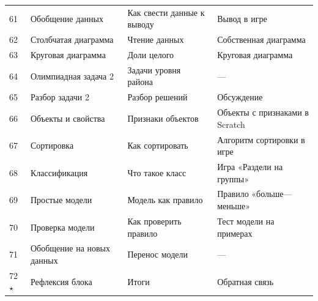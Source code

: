 \documentclass[12pt,a4paper]{article}
\begin{document}
\begin{longtable}{C{1.0cm}L{4.4cm}L{4.0cm}L{4.4cm}}
61 & Обобщение данных & Как свести данные к выводу & Вывод в игре\\
62 & Столбчатая диаграмма & Чтение данных & Собственная диаграмма\\
63 & Круговая диаграмма & Доли целого & Круговая диаграмма\\
64 & Олимпиадная задача 2 & Задачи уровня района & ---\\
65 & Разбор задачи 2 & Разбор решений & Обсуждение\\
66 & Объекты и свойства & Признаки объектов & Объекты с признаками в Scratch\\
67 & Сортировка & Как сортировать & Алгоритм сортировки в игре\\
68 & Классификация & Что такое класс & Игра «Раздели на группы»\\
69 & Простые модели & Модель как правило & Правило «больше---меньше»\\
70 & Проверка модели & Как проверить правило & Тест модели на примерах\\
71 & Обобщение на новых данных & Перенос модели & ---\\
72 $\star$ & Рефлексия блока & Итоги & Обратная связь\\
\midrule


\end{longtable}
\end{document}
